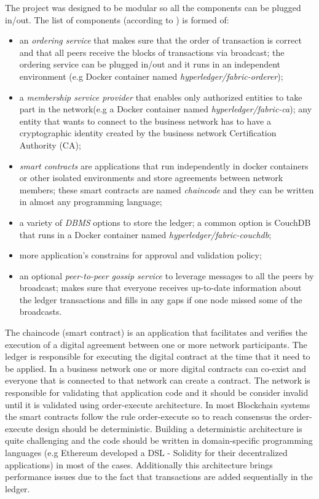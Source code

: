 The project was designed to be modular so all the components can be plugged in/out. The list of components (according to \cite{fabric-wiki}) is formed of:
\begin{itemize}
	\item an \emph{ordering service} that makes sure that the order of transaction is correct and that all peers receive the blocks of transactions via broadcast; the ordering service can be plugged in/out and it runs in an independent environment (e.g Docker container named \emph{hyperledger/fabric-orderer});
	\item a \emph{membership service provider} that enables only authorized entities to take part in the network(e.g a Docker container named \emph{hyperledger/fabric-ca}); any entity that wants to connect to the business network has to have a cryptographic identity created by the business network Certification Authority (CA);
	\item \emph{smart contracts} are applications that run independently in docker containers or other isolated environments and store agreements between network members; these smart contracts are named \emph{chaincode} and they can be written in almost any programming language;
	\item a variety of \emph{DBMS} options to store the ledger; a common option is CouchDB that runs in a Docker container named \emph{hyperledger/fabric-couchdb};
	\item more application's constrains for approval and validation policy;
	\item an optional \emph{peer-to-peer gossip service} to leverage messages to all the peers by broadcast; makes sure that everyone receives up-to-date information about the ledger transactions and fills in any gaps if one node missed some of the broadcasts.	
\end{itemize}

The chaincode (smart contract) is an application that facilitates and verifies the execution of a digital agreement between one or more network participants. The ledger is responsible for executing the digital contract at the time that it need to be applied. In a business network one or more digital contracts can co-exist and everyone that is connected to that network can create a contract. The network is responsible for validating that application code and it should be consider invalid until it is validated using order-execute architecture. In most Blockchain systems the smart contracts follow the rule order-execute so to reach consensus the order-execute design should be deterministic. Building a deterministic architecture  is quite challenging and the code should be written in domain-specific programming languages (e.g Ethereum developed a DSL - Solidity for their decentralized applications) in most of the cases.
Additionally this architecture brings performance issues due to the fact that transactions are added sequentially in the ledger.


